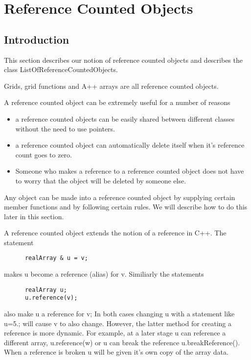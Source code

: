 
\newcommand{\LORCO}{ListOfReferenceCountedObjects}
\section{Reference Counted Objects}

\subsection{Introduction} 

This section describes our notion of reference counted
objects and describes the class {\ff \LORCO}. 

Grids, grid functions and A++ arrays are all reference
counted objects. 

A reference counted object can be
extremely useful for a number of reasons
\begin{itemize}
 \item a reference counted objects can be easily shared
        between different classes without the need to use 
        pointers.
 \item a reference counted object can automatically
        delete itself when it's reference count goes
        to zero. 
 \item Someone who makes a reference to
        a reference counted object does not have to
        worry that the object will be deleted by someone
        else. 
\end{itemize}


Any object can be made into a
reference counted object by supplying certain
member functions and by following certain rules.
We will describe how to do this later in this
section.

A reference counted object extends the
notion of a reference in C++. The statement
\begin{verbatim}
      realArray & u = v;
\end{verbatim}
makes {\ff u} become a reference (alias) for v.
Similiarly the statements
\begin{verbatim}
      realArray u; 
      u.reference(v);
\end{verbatim}
also make u a reference for v; In both cases changing {\ff u}
with a statement like {\ff u=5.;} will cause {\ff v} to also
change.
However, the latter method for creating
a reference is more dynamic. For example, at a later stage {\ff u} can
reference a different array, {\ff u.reference(w)} or {\ff u}
can break the reference {\ff u.breakReference()}. When a reference
is broken {\ff u} will be given it's own copy of the array data.

